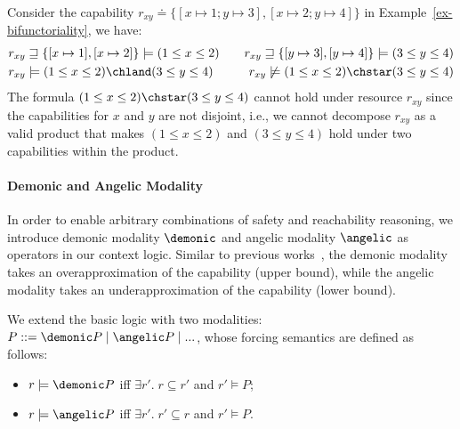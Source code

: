 \begin{example}\label{ex-basic-context-logic} Consider the capability $r_{xy} \doteq \{[x\mapsto1; y\mapsto3], [x\mapsto2; y\mapsto4]\}$ in Example~\ref{ex-bifunctoriality}, we have:
  \begin{align*}
    &r_{xy} \sqsupseteq \{[x\mapsto1], [x\mapsto2]\} \models (1 \leq x \leq 2)
    && &r_{xy} \sqsupseteq \{[y\mapsto3], [y\mapsto4]\} \models (3 \leq y \leq 4)
    \\ &r_{xy} \models (1 \leq x \leq 2) \chland (3 \leq y \leq 4)
    && &r_{xy} \not\models (1 \leq x \leq 2) \chstar (3 \leq y \leq 4)
  \end{align*}
The formula $(1 \leq x \leq 2) \chstar (3 \leq y \leq 4)$ cannot hold under resource $r_{xy}$ since the capabilities for $x$ and $y$ are not disjoint, i.e., we cannot decompose $r_{xy}$ as a valid product that makes $(1 \leq x \leq 2)$ and $(3 \leq y \leq 4)$ hold under two capabilities within the product.
\end{example}

\paragraph{Demonic and Angelic Modality} In order to enable arbitrary combinations of safety and reachability reasoning, we introduce demonic modality $\demonic$ and angelic modality $\angelic$ as operators in our context logic. Similar to previous works~\cite{OHP19}, the demonic modality takes an overapproximation of the capability (upper bound), while the angelic modality takes an underapproximation of the capability (lower bound).

\begin{definition}\label{def:demonic-and-angelic-modality} We extend the basic logic with two modalities: $P ::= \demonic P \mid \angelic P \mid ...$, whose forcing semantics are defined as follows:
  \begin{itemize}
    \item $r \models \demonic P$ iff $\exists r'.\; r \subseteq r'$ and
      $r' \models P$;
    \item $r \models \angelic P$ iff $\exists r'.\; r' \subseteq r$ and
      $r' \models P$.
    \end{itemize}
\end{definition}

